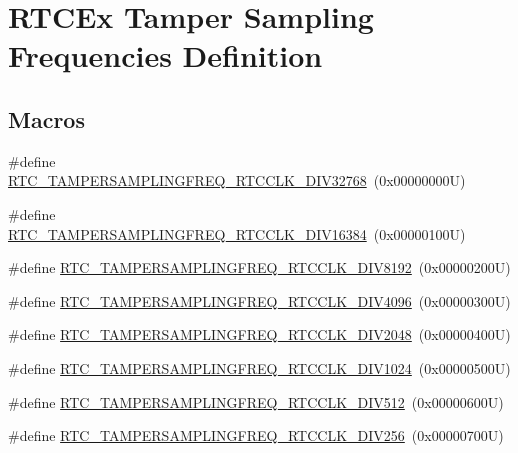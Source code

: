 \hypertarget{group___r_t_c_ex___tamper___sampling___frequencies___definitions}{}\section{R\+T\+C\+Ex Tamper Sampling Frequencies Definition}
\label{group___r_t_c_ex___tamper___sampling___frequencies___definitions}
\subsection*{Macros}
\begin{DoxyCompactItemize}
\item 
\#define \hyperlink{group___r_t_c_ex___tamper___sampling___frequencies___definitions_ga1d12bab8de77c51edc1b6a7a2e242991}{R\+T\+C\+\_\+\+T\+A\+M\+P\+E\+R\+S\+A\+M\+P\+L\+I\+N\+G\+F\+R\+E\+Q\+\_\+\+R\+T\+C\+C\+L\+K\+\_\+\+D\+I\+V32768}~(0x00000000\+U)
\item 
\#define \hyperlink{group___r_t_c_ex___tamper___sampling___frequencies___definitions_gab45c084cd1f2f36ecb19d7eb4e7c12b2}{R\+T\+C\+\_\+\+T\+A\+M\+P\+E\+R\+S\+A\+M\+P\+L\+I\+N\+G\+F\+R\+E\+Q\+\_\+\+R\+T\+C\+C\+L\+K\+\_\+\+D\+I\+V16384}~(0x00000100\+U)
\item 
\#define \hyperlink{group___r_t_c_ex___tamper___sampling___frequencies___definitions_ga48899e13c9b392c02278cd4166b49f4d}{R\+T\+C\+\_\+\+T\+A\+M\+P\+E\+R\+S\+A\+M\+P\+L\+I\+N\+G\+F\+R\+E\+Q\+\_\+\+R\+T\+C\+C\+L\+K\+\_\+\+D\+I\+V8192}~(0x00000200\+U)
\item 
\#define \hyperlink{group___r_t_c_ex___tamper___sampling___frequencies___definitions_gaa8257b2329aa2d170b66b7368c11943a}{R\+T\+C\+\_\+\+T\+A\+M\+P\+E\+R\+S\+A\+M\+P\+L\+I\+N\+G\+F\+R\+E\+Q\+\_\+\+R\+T\+C\+C\+L\+K\+\_\+\+D\+I\+V4096}~(0x00000300\+U)
\item 
\#define \hyperlink{group___r_t_c_ex___tamper___sampling___frequencies___definitions_ga681034d8247a44679e3ae277db187cb5}{R\+T\+C\+\_\+\+T\+A\+M\+P\+E\+R\+S\+A\+M\+P\+L\+I\+N\+G\+F\+R\+E\+Q\+\_\+\+R\+T\+C\+C\+L\+K\+\_\+\+D\+I\+V2048}~(0x00000400\+U)
\item 
\#define \hyperlink{group___r_t_c_ex___tamper___sampling___frequencies___definitions_gaad315c353bdd84397cb1d7db46c71cd3}{R\+T\+C\+\_\+\+T\+A\+M\+P\+E\+R\+S\+A\+M\+P\+L\+I\+N\+G\+F\+R\+E\+Q\+\_\+\+R\+T\+C\+C\+L\+K\+\_\+\+D\+I\+V1024}~(0x00000500\+U)
\item 
\#define \hyperlink{group___r_t_c_ex___tamper___sampling___frequencies___definitions_ga3748ae21496570bdc54354c7d9a8c91d}{R\+T\+C\+\_\+\+T\+A\+M\+P\+E\+R\+S\+A\+M\+P\+L\+I\+N\+G\+F\+R\+E\+Q\+\_\+\+R\+T\+C\+C\+L\+K\+\_\+\+D\+I\+V512}~(0x00000600\+U)
\item 
\#define \hyperlink{group___r_t_c_ex___tamper___sampling___frequencies___definitions_ga05ce782cafcbf04e6854739041052a9e}{R\+T\+C\+\_\+\+T\+A\+M\+P\+E\+R\+S\+A\+M\+P\+L\+I\+N\+G\+F\+R\+E\+Q\+\_\+\+R\+T\+C\+C\+L\+K\+\_\+\+D\+I\+V256}~(0x00000700\+U)
\end{DoxyCompactItemize}


